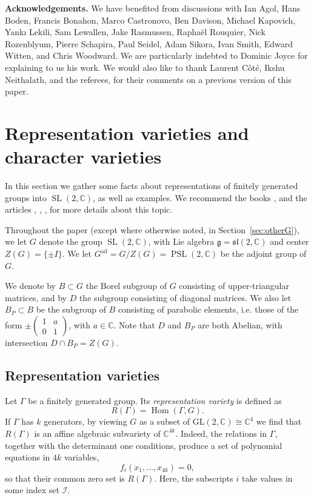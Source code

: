 \documentclass [11pt]{amsart}
\theoremstyle{remark}
\def\cc {{\mathbb{C}}}
\def\C{\cc}
\def\I {\mathcal{I}}
\def\g{\mathfrak{g}}
\def\Gad{G^{\operatorname{ad}}}
\def\sl {{\operatorname{SL}(2, \cc)}}
\def\psl {{\operatorname{PSL}(2, \cc)}}
\def\Rep {R}
\def\Hom {\operatorname{Hom}}
\begin{document}
\medskip
\textbf{Acknowledgements.} We have benefited from discussions with Ian Agol, Hans Boden, Francis Bonahon, Marco Castronovo, Ben Davison, Michael Kapovich, Yank{\i} Lekili, Sam Lewallen, Jake Rasmussen, Rapha\"el Rouquier, Nick Rozenblyum, Pierre Schapira, Paul Seidel, Adam Sikora, Ivan Smith, Edward Witten, and Chris Woodward. We are particularly indebted to Dominic Joyce for explaining to us his work. We would also like to thank Laurent C\^ot\'e, Ikshu Neithalath, and the referees, for their comments on a previous version of this paper.






\section{Representation varieties and character varieties}
\label{sec:Varieties}

In this section we gather some facts about representations of finitely generated groups into $\sl$, as well as examples. We recommend the books  \cite{LubotzkyMagid}, \cite{KapovichBook} and the articles \cite{Goldman}, \cite{CullerShalen}, \cite{Heusener}, \cite{Sikora}
for more details about this topic.

Throughout the paper (except where otherwise noted, in Section~\ref{sec:otherG}), we let $G$ denote the group $\sl$, with Lie algebra $\g= \mathfrak{sl}(2, \C)$ and center $Z(G) = \{\pm I\}$. We let $\Gad = G/Z(G)=\psl$ be the adjoint group of $G$.

We denote by $B \subset G$ the Borel subgroup of $G$ consisting of upper-triangular matrices, and by $D$ the subgroup consisting of diagonal matrices. We also let $B_{P} \subset B$ be the subgroup of $B$ consisting of parabolic elements, i.e. those of the form $\pm \begin{pmatrix} 1 & a \\ 0 & 1 \end{pmatrix}$, with $a \in \C$. Note that $D$ and $B_P$ are both Abelian, with intersection $D \cap B_P = Z(G)$.

\subsection{Representation varieties}
\label{sec:varieties}
Let $\Gamma$ be a finitely generated group. Its {\em representation variety} is defined as
$$  \Rep(\Gamma) = \Hom(\Gamma, G).$$
If $\Gamma$ has $k$ generators, by viewing $G$ as a subset of $\text{GL}(2,\C)\cong \C^4$ we find that $\Rep(\Gamma)$ is an affine algebraic subvariety of $\C^{4k}$. Indeed, the relations in $\Gamma$, together with the determinant one conditions, produce a set of polynomial equations in $4k$ variables,
$$ f_i(x_1, \dots, x_{4k})=0,$$
so that their common zero set is $\Rep(\Gamma)$. Here, the subscripts $i$ take values in some index set $\I$.
\end{document}
